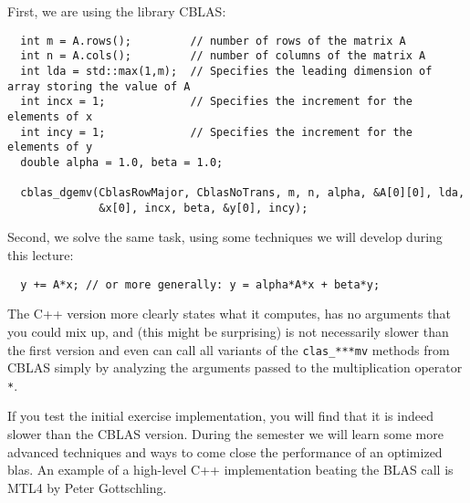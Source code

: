 First, we are using the library CBLAS:
%
\begin{verbatim}
  int m = A.rows();         // number of rows of the matrix A
  int n = A.cols();         // number of columns of the matrix A
  int lda = std::max(1,m);  // Specifies the leading dimension of array storing the value of A
  int incx = 1;             // Specifies the increment for the elements of x
  int incy = 1;             // Specifies the increment for the elements of y
  double alpha = 1.0, beta = 1.0;

  cblas_dgemv(CblasRowMajor, CblasNoTrans, m, n, alpha, &A[0][0], lda,
              &x[0], incx, beta, &y[0], incy);
\end{verbatim}
%
Second, we solve the same task, using some techniques we will develop during this lecture:
%
\begin{verbatim}
  y += A*x; // or more generally: y = alpha*A*x + beta*y;
\end{verbatim}

The C++ version more clearly states what it computes, has no arguments that you could mix up, and (this might be
surprising) is not necessarily slower than the first version and even can call all variants of the \texttt{clas\_***mv} methods
from CBLAS simply by analyzing the arguments passed to the multiplication operator \texttt{*}.

\begin{rem}
  If you test the initial exercise implementation, you will find that it is indeed slower than the CBLAS version. During the semester
  we will learn some more advanced techniques and ways to come close the performance of an optimized blas. An example of a high-level
  C++ implementation beating the BLAS call is MTL4 by Peter Gottschling.
\end{rem}

